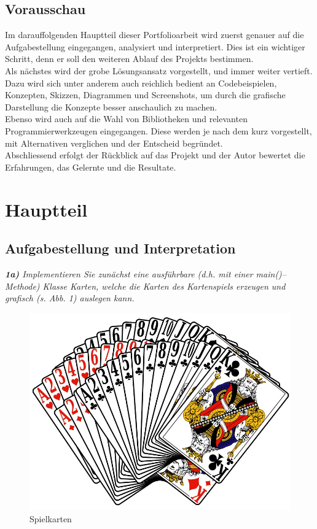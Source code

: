 \documentclass[a4paper,11pt]{article}
\begin{document}
\subsection{Vorausschau}

Im darauffolgenden Hauptteil dieser Portfolioarbeit wird zuerst genauer auf die Aufgabestellung eingegangen, analysiert und interpretiert. Dies ist ein wichtiger Schritt, denn er soll den weiteren Ablauf des Projekts bestimmen.\\

Als nächstes wird der grobe Lösungsansatz vorgestellt, und immer weiter vertieft. Dazu wird sich unter anderem auch reichlich bedient an Codebeispielen, Konzepten, Skizzen, Diagrammen und Screenshots, um durch die grafische Darstellung die Konzepte besser anschaulich zu machen.\\

Ebenso wird auch auf die Wahl von Bibliotheken und relevanten Programmierwerkzeugen eingegangen. Diese werden je nach dem kurz vorgestellt, mit Alternativen verglichen und der Entscheid begründet.\\

Abschliessend erfolgt der Rückblick auf das Projekt und der Autor bewertet die Erfahrungen, das Gelernte und die Resultate.


\section{Hauptteil}

\subsection{Aufgabestellung und Interpretation}

\textit{\textbf{1a)} Implementieren Sie zunächst eine ausführbare (d.h. mit einer main()–Methode) Klasse Karten, welche die Karten des Kartenspiels erzeugen und grafisch (s. Abb. 1) auslegen kann.}

\begin{figure}[H]
    \centering
    \includegraphics[width=.45\textwidth]{media/spielkarten.jpg}
    \caption{Spielkarten}
\end{figure}
\end{document}
